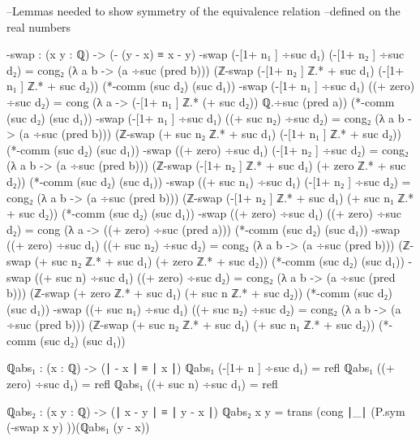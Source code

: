 \documentclass[11pt,a4paper]{article}
\begin{document}
\begin{code}
--Lemmas needed to show symmetry of the equivalence relation 
--defined on the real numbers

-swap : (x y : ℚ) -> (- (y - x) ≡ x - y)
-swap (-[1+ n₁ ] ÷suc d₁) (-[1+ n₂ ] ÷suc d₂) = 
  cong₂ (λ a b -> (a ÷suc (pred b))) 
  (ℤ-swap (-[1+ n₂ ] ℤ.* + suc d₁) (-[1+ n₁ ] ℤ.* + suc d₂)) 
  (*-comm (suc d₂) (suc d₁))
-swap (-[1+ n₁ ] ÷suc d₁) ((+ zero) ÷suc d₂) = 
  cong (λ a -> (-[1+ n₁ ] ℤ.* (+ suc d₂)) ℚ.÷suc (pred a))
  (*-comm (suc d₂) (suc d₁))
-swap (-[1+ n₁ ] ÷suc d₁) ((+ suc n₂) ÷suc d₂) = 
  cong₂ (λ a b -> (a ÷suc (pred b))) 
  (ℤ-swap (+ suc n₂ ℤ.* + suc d₁) (-[1+ n₁ ] ℤ.* + suc d₂)) 
  (*-comm (suc d₂) (suc d₁))
-swap ((+ zero) ÷suc d₁) (-[1+ n₂ ] ÷suc d₂) = 
  cong₂ (λ a b -> (a ÷suc (pred b))) 
  (ℤ-swap (-[1+ n₂ ] ℤ.* + suc d₁) (+ zero ℤ.* + suc d₂)) 
  (*-comm (suc d₂) (suc d₁))
-swap ((+ suc n₁) ÷suc d₁) (-[1+ n₂ ] ÷suc d₂) = 
  cong₂ (λ a b -> (a ÷suc (pred b))) 
  (ℤ-swap (-[1+ n₂ ] ℤ.* + suc d₁) (+ suc n₁ ℤ.* + suc d₂)) 
  (*-comm (suc d₂) (suc d₁))
-swap ((+ zero) ÷suc d₁) ((+ zero) ÷suc d₂) = 
  cong (λ a -> ((+ zero) ÷suc (pred a)))
  (*-comm (suc d₂) (suc d₁))
-swap ((+ zero) ÷suc d₁) ((+ suc n₂) ÷suc d₂) = 
  cong₂ (λ a b -> (a ÷suc (pred b))) 
  (ℤ-swap (+ suc n₂ ℤ.* + suc d₁) (+ zero ℤ.* + suc d₂)) 
  (*-comm (suc d₂) (suc d₁))
-swap ((+ suc n) ÷suc d₁) ((+ zero) ÷suc d₂) = 
  cong₂ (λ a b -> (a ÷suc (pred b))) 
  (ℤ-swap (+ zero ℤ.* + suc d₁) (+ suc n ℤ.* + suc d₂)) 
  (*-comm (suc d₂) (suc d₁))
-swap ((+ suc n₁) ÷suc d₁) ((+ suc n₂) ÷suc d₂) = 
  cong₂ (λ a b -> (a ÷suc (pred b))) 
  (ℤ-swap (+ suc n₂ ℤ.* + suc d₁) (+ suc n₁ ℤ.* + suc d₂)) 
  (*-comm (suc d₂) (suc d₁))

ℚabs₁ : (x : ℚ) -> (∣ - x ∣ ≡ ∣ x ∣)
ℚabs₁ (-[1+ n ] ÷suc d₁) = refl
ℚabs₁ ((+ zero) ÷suc d₁) = refl
ℚabs₁ ((+ suc n) ÷suc d₁) = refl

ℚabs₂ : (x y : ℚ) -> (∣ x - y ∣ ≡ ∣ y - x ∣)
ℚabs₂ x y = trans (cong ∣_∣ (P.sym (-swap x y) ))(ℚabs₁ (y - x))



\end{code}
\end{document}
